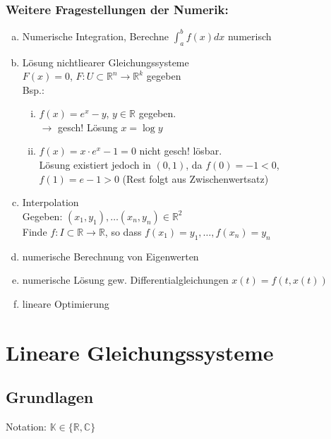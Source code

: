 \subsubsection*{Weitere Fragestellungen der Numerik:}

\begin{enumerate}[(a)]
\item
Numerische Integration, Berechne $\int_a^b f(x) dx$ numerisch
\item
Lösung nichtliearer Gleichungssysteme \\
$F(x) = 0$, $F: U \subset \mathbb{R}^n \rightarrow \mathbb{R}^k$ gegeben \\
Bsp.:
\begin{enumerate}[(i)]
\item
$f(x)=e^x-y$, $y \in \mathbb{R}$ gegeben. \\
$\rightarrow$ gesch! Lösung $x = \log y$ 
\item
$f(x)=x \cdot e^x -1 = 0$ nicht gesch! lösbar. \\
Lösung existiert jedoch in $(0,1)$, da $f(0) = -1 < 0$, \\
$f(1)= e-1>0 $ (Rest folgt aus Zwischenwertsatz)
\end{enumerate}
\item
Interpolation \\
Gegeben: $(x_1,y_1), \dots (x_n,y_n) \in \mathbb{R}^2$\\
Finde $f: I \subset \mathbb{R} \rightarrow \mathbb{R}$, so dass 
$f(x_1) = y_1, \dots , f(x_n)=y_n$
\item
numerische Berechnung von Eigenwerten
\item
numerische Lösung gew. Differentialgleichungen $x(t)=f(t,x(t))$
\item
lineare Optimierung
\end{enumerate}

\section{Lineare Gleichungssysteme}
\subsection{Grundlagen}
Notation: $\mathbb{K} \in \{\mathbb{R}, \mathbb{C}\}$ \\

